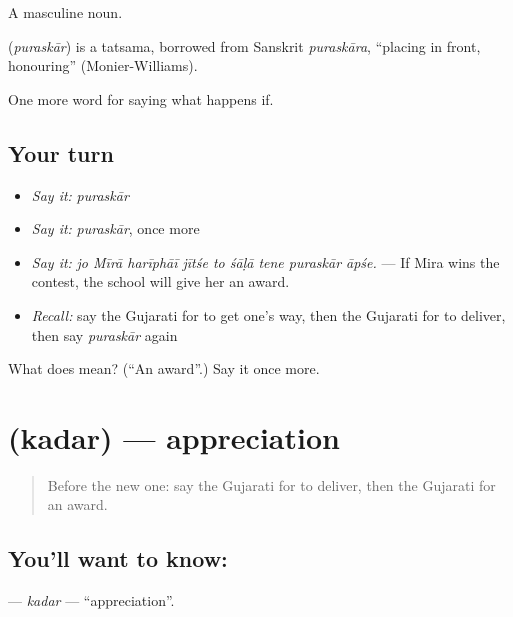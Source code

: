A masculine noun.

\begin{cousinweb}
\textbf{} (\emph{puraskār}) is a tatsama, borrowed from Sanskrit \emph{puraskāra}, \textquotedblleft{}placing in front, honouring\textquotedblright{} (Monier-Williams).
\end{cousinweb}

\begin{grammarlens}[title={What you've built}]
One more word for saying what happens if.
\end{grammarlens}

\subsection*{Your turn}
\begin{itemize}
\raggedright
  \item \emph{Say it:} \emph{puraskār}
  \item \emph{Say it:} \emph{puraskār}, once more
  \item \emph{Say it:} \emph{jo Mīrā harīphāī jītśe to śāḷā tene puraskār āpśe.} — If Mira wins the contest, the school will give her an award.
  \item \emph{Recall:} say the Gujarati for to get one's way, then the Gujarati for to deliver, then say \emph{puraskār} again
\end{itemize}

\begin{tcolorbox}[breakable,colback=teal!4,colframe=teal!35!black,title={Before you move on}]
What does  mean? (\textquotedblleft{}An award\textquotedblright{}.) Say it once more.
\end{tcolorbox}
\section[\texorpdfstring{\gu{કદર} (kadar)}{કદર (kadar)}]{ (kadar) — appreciation}

\label{lesson:GU-C385-kadar}



\begin{quote}
Before the new one: say the Gujarati for to deliver, then the Gujarati for an award.
\end{quote}

\subsection*{You'll want to know: }
\textbf{} — \emph{kadar} — \textquotedblleft{}appreciation\textquotedblright{}.

